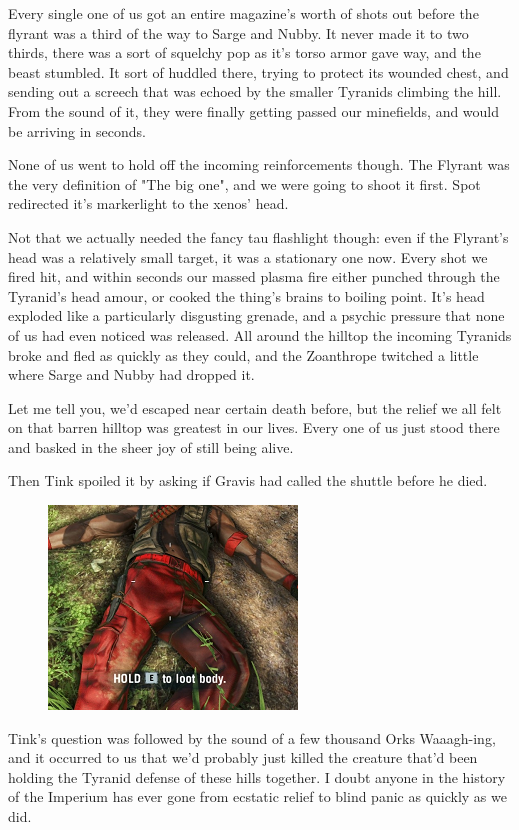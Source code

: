 Every single one of us got an entire magazine's worth of shots out before the flyrant was a third of the way to Sarge and Nubby. 
It never made it to two thirds, there was a sort of squelchy pop as it's torso armor gave way, and the beast stumbled. 
It sort of huddled there, trying to protect its wounded chest, and sending out a screech that was echoed by the smaller Tyranids climbing the hill. 
From the sound of it, they were finally getting passed our minefields, and would be arriving in seconds.

None of us went to hold off the incoming reinforcements though. 
The Flyrant was the very definition of "The big one", and we were going to shoot it first. 
Spot redirected it's markerlight to the xenos' head.

Not that we actually needed the fancy tau flashlight though: 
even if the Flyrant's head was a relatively small target, it was a stationary one now. 
Every shot we fired hit, and within seconds our massed plasma fire either punched through the Tyranid's head amour, or cooked the thing's brains to boiling point. 
It's head exploded like a particularly disgusting grenade, and a psychic pressure that none of us had even noticed was released. 
All around the hilltop the incoming Tyranids broke and fled as quickly as they could, and the Zoanthrope twitched a little where Sarge and Nubby had dropped it.

Let me tell you, we'd escaped near certain death before, but the relief we all felt on that barren hilltop was greatest in our lives. 
Every one of us just stood there and basked in the sheer joy of still being alive. 


Then Tink spoiled it by asking if Gravis had called the shuttle before he died.
\begin{figure}
	\begin{center}
		\includegraphics[width=\figwidth]{pics/12/53.png}
	\end{center}
\end{figure}
Tink's question was followed by the sound of a few thousand Orks Waaagh-ing, and it occurred to us that we'd probably just killed the creature that'd been holding the Tyranid defense of these hills together. 
I doubt anyone in the history of the Imperium has ever gone from ecstatic relief to blind panic as quickly as we did.

